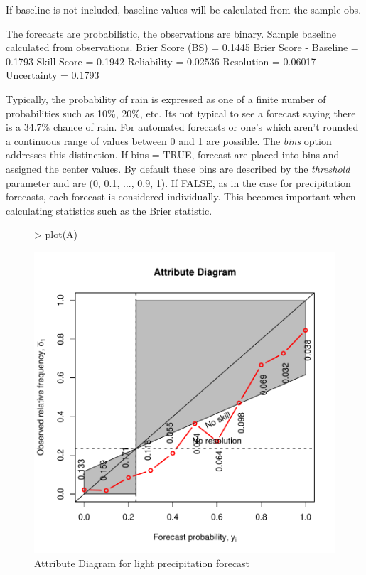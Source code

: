\documentclass{article}
\begin{document}
\begin{Schunk}
\begin{Soutput}
If baseline is not included, baseline values  will be calculated from the  sample obs. 
\end{Soutput}
\begin{Soutput}
The forecasts are probabilistic, the observations are binary.
Sample baseline calculated from observations.
Brier Score (BS)           =  0.1445 
Brier Score - Baseline     =  0.1793 
Skill Score                =  0.1942 
Reliability                =  0.02536 
Resolution                 =  0.06017 
Uncertainty              =  0.1793 
\end{Soutput}
\end{Schunk}

Typically, the probability of rain is expressed as one of a finite
number of probabilities such as 10\%, 20\%, etc.  Its not typical to 
see a forecast saying there is a 34.7\% chance of rain.  For automated
forecasts  or one's which aren't rounded a continuous range
of values between 0 and 1 are possible.   The \textit{bins} option addresses this
distinction.  If bins = TRUE,  forecast are placed into bins and
assigned the center values.  By default these bins are described by
the \textit{threshold} parameter and are (0, 0.1, ..., 0.9, 1).  If
FALSE, as in the case for precipitation forecasts, each forecast is
considered individually.  This becomes important when calculating
statistics such as the Brier statistic.

\begin {center}
\begin{figure}[H]
\begin{Schunk}
\begin{Sinput}
> plot(A)
\end{Sinput}
\end{Schunk}
\includegraphics{verification-004}
\caption{\label{att.diag} Attribute Diagram for light precipitation forecast}
\end{figure}
\end{center}    
\end{document}
